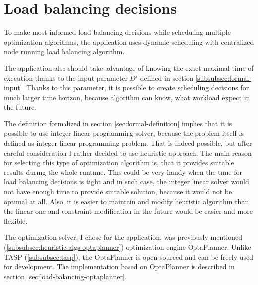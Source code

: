 \section{Load balancing decisions}\label{sec:load-balancing-decisions}

To make most informed load balancing decisions while scheduling multiple optimization algorithms,
the application uses dynamic scheduling with centralized node running load balancing algorithm.

The application also should take advantage of knowing the exact maximal time of execution thanks to the input parameter $D^{j}$ 
defined in section \ref{subsubsec:formal-input}.
Thanks to this parameter, 
it is possible to create scheduling decisions for much larger time horizon, 
because algorithm can know,
what workload expect in the future.

The definition formalized in section \ref{sec:formal-definition} implies 
that it is possible to use integer linear programming solver, 
because the problem itself is defined as integer linear programming problem.
That is indeed possible, 
but after careful consideration I rather decided to use heuristic approach.
The main reason for selecting this type of optimization algorithm is,
that it provides suitable results during the whole runtime.
This could be very handy when the time for load balancing decisions is tight
and in such case, the integer linear solver would not have enough time to provide suitable solution,
because it would not be optimal at all.
Also, 
it is easier to maintain and modify heuristic algorithm than the linear one
and constraint modification in the future would be easier and more flexible.

The optimization solver, I chose for the application,
was previously mentioned (\ref{subsubsec:heuristic-algs-optaplanner}) optimization engine OptaPlanner.
Unlike TASP (\ref{subsubsec:tasp}), the OptaPlanner is open sourced and can be freely used for development.
The implementation based on OptaPlanner is described in section \ref{sec:load-balancing-optaplanner}.